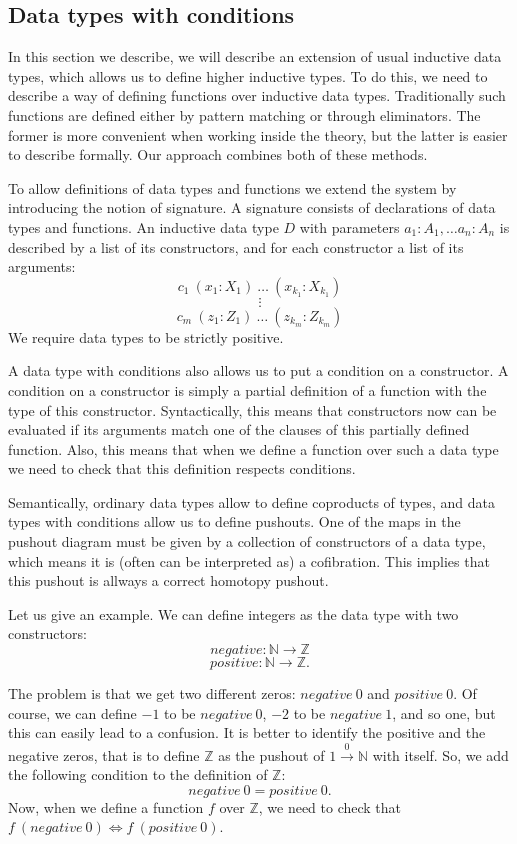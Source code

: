 \documentclass{amsart}
\theoremstyle{definition}
\theoremstyle{remark}
\newcommand{\deq}{\Leftrightarrow}
\numberwithin{figure}{section}
\begin{document}
\subsection{Data types with conditions}

In this section we describe, we will describe an extension of usual inductive data types, which allows us to define higher inductive types.
To do this, we need to describe a way of defining functions over inductive data types.
Traditionally such functions are defined either by pattern matching or through eliminators.
The former is more convenient when working inside the theory, but the latter is easier to describe formally.
Our approach combines both of these methods.

To allow definitions of data types and functions we extend the system by introducing the notion of signature.
A signature consists of declarations of data types and functions.
An inductive data type $D$ with parameters $a_1 : A_1, \ldots a_n : A_n$ is described by a list of its constructors, and for each constructor a list of its arguments:
\[ c_1\ (x_1 : X_1)\ \ldots\ (x_{k_1} : X_{k_1}) \]
\[ \vdots \]
\[ c_m\ (z_1 : Z_1)\ \ldots\ (z_{k_m} : Z_{k_m}) \]
We require data types to be strictly positive.

A data type with conditions also allows us to put a condition on a constructor.
A condition on a constructor is simply a partial definition of a function with the type of this constructor.
Syntactically, this means that constructors now can be evaluated if its arguments match one of the clauses of this partially defined function.
Also, this means that when we define a function over such a data type we need to check that this definition respects conditions.

Semantically, ordinary data types allow to define coproducts of types, and data types with conditions allow us to define pushouts.
One of the maps in the pushout diagram must be given by a collection of constructors of a data type, which means it is (often can be interpreted as) a cofibration.
This implies that this pushout is allways a correct homotopy pushout.

Let us give an example. We can define integers as the data type with two constructors:
\[ negative : \mathbb{N} \to \mathbb{Z} \]
\[ positive : \mathbb{N} \to \mathbb{Z}. \]

The problem is that we get two different zeros: $negative\ 0$ and $positive\ 0$.
Of course, we can define $-1$ to be $negative\ 0$, $-2$ to be $negative\ 1$, and so one, but this can easily lead to a confusion.
It is better to identify the positive and the negative zeros, that is to define $\mathbb{Z}$ as the pushout of $1 \overset{0}\to \mathbb{N}$ with itself.
So, we add the following condition to the definition of $\mathbb{Z}$:
\[ negative\ 0 = positive\ 0. \]
Now, when we define a function $f$ over $\mathbb{Z}$, we need to check that $f\ (negative\ 0) \deq f\ (positive\ 0)$.
\end{document}
